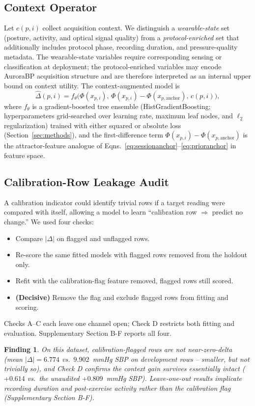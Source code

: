\documentclass[12pt]{article}
\newtheorem{finding}{Finding}
\begin{document}
\subsection{Context Operator}
\label{sec:context}
Let $c(p,i)$ collect acquisition context. We distinguish a \emph{wearable-state} set (posture, activity, and optical signal quality) from a \emph{protocol-enriched} set that additionally includes protocol phase, recording duration, and pressure-quality metadata. The wearable-state variables require corresponding sensing or classification at deployment; the protocol-enriched variables may encode AuroraBP acquisition structure and are therefore interpreted as an internal upper bound on context utility. The context-augmented model is
\begin{equation}
\hat{\Delta}(p,i) = f_\theta\big(\Phi(x_{p,i}),\, \Phi(x_{p,i}) - \Phi(x_{p,\mathrm{anchor}}),\, c(p,i)\big),
\label{eq:model}
\end{equation}
where $f_\theta$ is a gradient-boosted tree ensemble (HistGradientBoosting; hyperparameters grid-searched over learning rate, maximum leaf nodes, and $\ell_2$ regularization) trained with either squared or absolute loss (Section~\ref{sec:methods}), and the first-difference term $\Phi(x_{p,i}) - \Phi(x_{p,\mathrm{anchor}})$ is the attractor-feature analogue of Eqns.~\ref{eq:sessionanchor}--\ref{eq:prioranchor} in feature space.
\subsection{Calibration-Row Leakage Audit}
\label{sec:leakage}
A calibration indicator could identify trivial rows if a target reading were compared with itself, allowing a model to learn ``calibration row $\Rightarrow$ predict no change.'' We used four checks:
\begin{itemize}
\item[\textbf{A}] Compare $|\Delta|$ on flagged and unflagged rows.
\item[\textbf{B}] Re-score the same fitted models with flagged rows removed from the holdout only.
\item[\textbf{C}] Refit with the calibration-flag feature removed, flagged rows still scored.
\item[\textbf{D}] \textbf{(Decisive)} Remove the flag and exclude flagged rows from fitting and scoring.
\end{itemize}
Checks A--C each leave one channel open; Check D restricts both fitting and evaluation. Supplementary Section B-F reports all four.
\begin{finding}
On this dataset, calibration-flagged rows are \emph{not} near-zero-delta (mean $|\Delta|=6.774$ vs.\ $9.902$~mmHg SBP on development rows -- smaller, but not trivially so), and Check D confirms the context gain survives essentially intact ($+0.614$ vs.\ the unaudited $+0.809$~mmHg SBP). Leave-one-out results implicate recording duration and post-exercise activity rather than the calibration flag (Supplementary Section B-F).
\end{finding}
\end{document}

